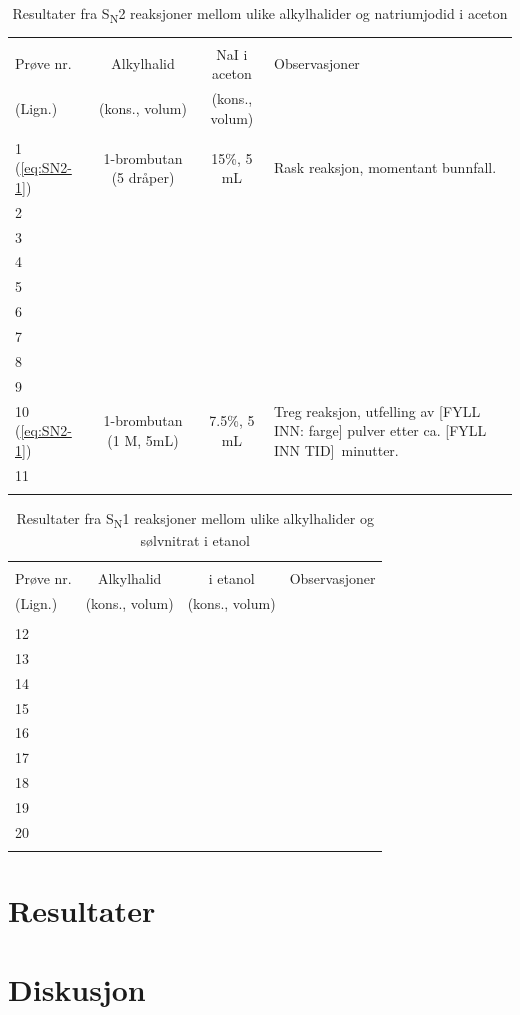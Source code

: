 \begin{table}
	\begin{center}
		\caption{Resultater fra \texorpdfstring{S\textsubscript{N}2}r reaksjoner mellom ulike alkylhalider og natriumjodid i aceton}
		\label{tab:iaceton}
		\begin{tabular}{lccl}
			\toprule\\
			Prøve nr. & Alkylhalid & NaI i aceton & Observasjoner\\
			(Lign.) & (kons., volum) & (kons., volum) & \\
			\midrule\\
			1 (\ref{eq:SN2-1}) & 1-brombutan (5 dråper) & 15\%, 5 \si{\milli\liter} & Rask reaksjon, momentant bunnfall.\\
			2 & & & \\
			3 & & & \\
			4 & & & \\
			5 & & & \\
			6 & & & \\
			7 & & & \\
			8 & & & \\
			9 & & & \\
			10 (\ref{eq:SN2-1}) & 1-brombutan (1 M, 5\si{\milli\liter}) & 7.5\%, 5 \si{\milli\liter} & Treg reaksjon, utfelling av [FYLL INN: farge] pulver etter ca. [FYLL INN TID] minutter.\\
			11 & & & \\
			\bottomrule\\
		\end{tabular}
	\end{center}
\end{table}


\begin{table}
	\begin{center}
		\caption{Resultater fra \texorpdfstring{S\textsubscript{N}1}r reaksjoner mellom ulike alkylhalider og sølvnitrat i etanol}
		\label{tab:ietanol}
		\begin{tabular}{lccl}
			\toprule\\
			Prøve nr. & Alkylhalid & \ce{AgNO3} i etanol & Observasjoner\\
			(Lign.) & (kons., volum) & (kons., volum) & \\
			\midrule\\
			12 \\
			13 \\
			14 \\
			15 \\
			16 \\
			17 \\
			18 \\
			19 \\
			20 \\
			\bottomrule\\
		\end{tabular}
	\end{center}
\end{table}

\section{Resultater}

\section{Diskusjon}
